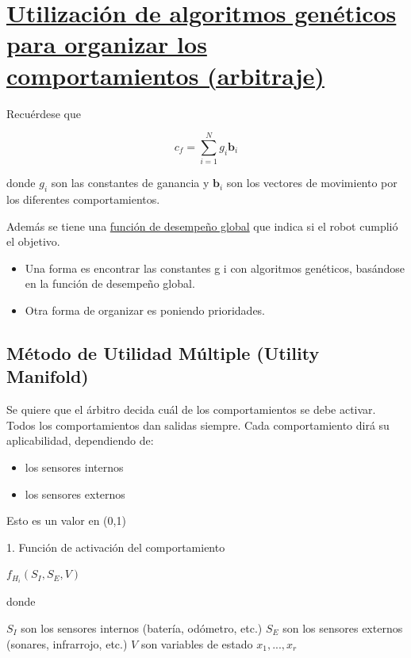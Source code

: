 \section{\underline{Utilización de algoritmos genéticos para organizar los comportamientos (arbitraje)}}


Recuérdese que

$$c_f = \sum_{i=1}^{N} g_i \textbf{b}_i
 $$

donde $g_i$ son las constantes de ganancia y $\textbf{b}_i$ son los vectores de movimiento por los diferentes
comportamientos.

Además se tiene una \underline{función de desempeño global} que indica si el robot cumplió el objetivo.

\begin{itemize}
	\item[\textbullet]Una forma es encontrar las constantes g i con algoritmos genéticos, basándose en la función de
	desempeño global.
	\item[\textbullet]Otra forma de organizar es poniendo prioridades.
\end{itemize}

\subsection{Método de Utilidad Múltiple (Utility Manifold)}
Se quiere que el árbitro decida cuál de los comportamientos se debe activar.
Todos los comportamientos dan salidas siempre.
Cada comportamiento dirá su aplicabilidad, dependiendo de:

\begin{itemize}
		\item[\textbullet]los sensores internos
		\item[\textbullet]los sensores externos
\end{itemize}

Esto es un valor en (0,1)

1. Función de activación del comportamiento

$f_{H_i} (S_I, S_E , V)$

donde 

$S_I$ son los sensores internos (batería, odómetro, etc.)
$S_E$ son los sensores externos (sonares, infrarrojo, etc.) 
$V$ son variables de estado $x_1 ,..., x_r$


